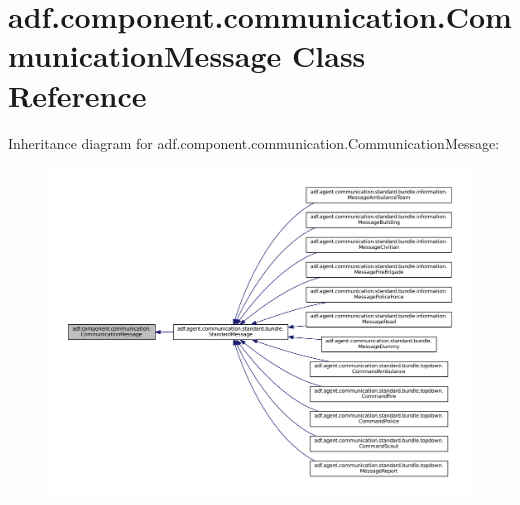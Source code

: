 \hypertarget{classadf_1_1component_1_1communication_1_1CommunicationMessage}{}\section{adf.\+component.\+communication.\+Communication\+Message Class Reference}
\label{classadf_1_1component_1_1communication_1_1CommunicationMessage}


Inheritance diagram for adf.\+component.\+communication.\+Communication\+Message\+:
\nopagebreak
\begin{figure}[H]
\begin{center}
\leavevmode
\includegraphics[width=350pt]{classadf_1_1component_1_1communication_1_1CommunicationMessage__inherit__graph}
\end{center}
\end{figure}
